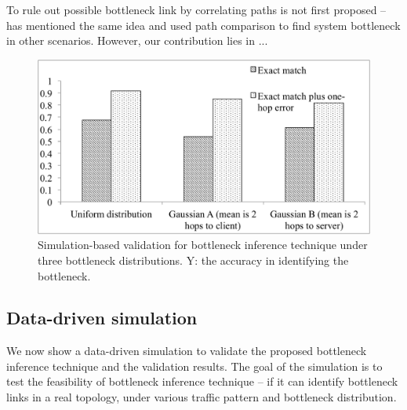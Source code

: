 To rule out possible bottleneck link by correlating paths is not first proposed -- \cite{} has mentioned the same idea and \cite{} used path comparison to find system bottleneck in other scenarios. However, our contribution lies in ...

\begin{figure}[h]
\begin{center}
\includegraphics[scale=0.4] {figures/bottle-sim-bar.pdf}
\caption{Simulation-based validation for bottleneck inference technique under three bottleneck distributions. Y: the accuracy in identifying the bottleneck.}
\label{fig:cdn-criticalAttributeSets}
\end{center}
\end{figure}

\subsection{Data-driven simulation}
We now show a data-driven simulation to validate the proposed bottleneck inference technique and the validation results. The goal of the simulation is to test the feasibility of bottleneck inference technique -- if it can identify bottleneck links in a real topology, under various traffic pattern and bottleneck distribution. 

